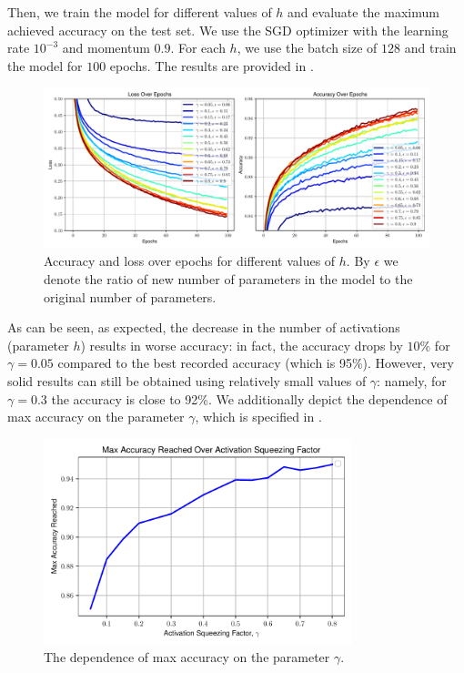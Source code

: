 \documentclass{iacrtrans}
\begin{document}
Then, we train the model for different values of $h$ and evaluate the maximum
achieved accuracy on the test set. We use the SGD optimizer with the 
learning rate $10^{-3}$ and momentum $0.9$. For each $h$, we use 
the batch size of $128$ and train the model for $100$ epochs. The results are
provided in .

\begin{figure}[H]
    \centering
    \includegraphics[width=\textwidth]{../code/images/accuracy_loss_over_epochs_3.pdf}
    \caption{Accuracy and loss over epochs for different values of $h$. By 
    $\epsilon$ we denote the ratio of new number of parameters in the model 
    to the original number of parameters.}
    \label{figure:results}
\end{figure}

As can be seen, as expected, the decrease in the number of activations
(parameter $h$) results in worse accuracy: in fact, the accuracy drops by $10\%$
for $\gamma=0.05$ compared to the best recorded accuracy (which is 95\%).
However, very solid results can still be obtained using relatively small values
of $\gamma$: namely, for $\gamma=0.3$ the accuracy is close to 92\%. We 
additionally depict the dependence of max accuracy on the parameter $\gamma$, 
which is specified in .

\begin{figure}
    \centering
    \includegraphics[width=0.8\textwidth]{../code/images/max_accuracy_over_squeeze.pdf}
    \caption{The dependence of max accuracy on the parameter $\gamma$.}
    \label{fig:accuracies}
\end{figure}
\end{document}
